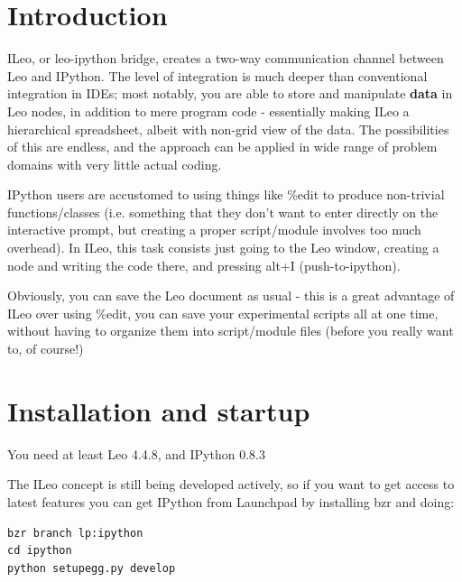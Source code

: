 \documentclass[a4paper,10pt,english]{sphinxmanual}
\begin{document}
\section{Introduction}
\label{IPythonBridge:console-window}\label{IPythonBridge:introduction}
ILeo, or leo-ipython bridge, creates a two-way communication channel between Leo
and IPython. The level of integration is much deeper than conventional
integration in IDEs; most notably, you are able to store and manipulate \textbf{data}
in Leo nodes, in addition to mere program code - essentially making ILeo a
hierarchical spreadsheet, albeit with non-grid view of the data. The
possibilities of this are endless, and the approach can be applied in wide range
of problem domains with very little actual coding.

IPython users are accustomed to using things like \%edit to produce non-trivial
functions/classes (i.e. something that they don't want to enter directly on the
interactive prompt, but creating a proper script/module involves too much
overhead). In ILeo, this task consists just going to the Leo window, creating a node
and writing the code there, and pressing alt+I (push-to-ipython).

Obviously, you can save the Leo document as usual - this is a great advantage
of ILeo over using \%edit, you can save your experimental scripts all at one
time, without having to organize them into script/module files (before you
really want to, of course!)


\section{Installation and startup}
\label{IPythonBridge:installation-and-startup}
You need at least Leo 4.4.8, and IPython 0.8.3

The ILeo concept is still being developed actively, so if you want to get access
to latest features you can get IPython from Launchpad by installing bzr and
doing:

\begin{Verbatim}[commandchars=\\\{\}]
bzr branch lp:ipython
cd ipython
python setupegg.py develop
\end{Verbatim}
\end{document}
